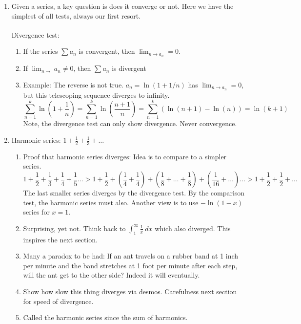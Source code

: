 \documentclass{article}
\begin{document}
\begin{enumerate}
\item Given a series, a key question is does it converge or not. Here we have the simplest of all tests, always our first resort. \\ \ \\
Divergence test:
\begin{enumerate}
\item If the series $\sum a_n$ is convergent, then $\lim_{n\rightarrow a_n} =0$. 
\item If $\lim_{n\rightarrow }a_n\neq 0$, then $\sum a_n$ is divergent
\item Example: The reverse is not true. $a_n =\ln (1+1/n)$ has $\lim_{n\rightarrow a_n} =0$, but this telescoping sequence diverges to infinity.
$$
\sum_{n=1}^k \ln\left(1+\frac{1}{n}\right) =
\sum_{n=1}^k \ln\left(\frac{n+1}{n}\right) =
\sum_{n=1}^k \left(\ln(n+1)-\ln(n) \right) = 
\ln(k+1)
$$
Note, the divergence test can only show divergence. Never convergence.

\end{enumerate}
\item Harmonic series: $1+\frac{1}{2} + \frac{1}{3} + \dots$
\begin{enumerate}

\item Proof that harmonic series diverges: Idea is to compare to a simpler series.
\[
1+\frac{1}{2} + \frac{1}{3} + \frac{1}{4} + \frac{1}{5} \dots >
1+\frac{1}{2} + \left( \frac{1}{4} + \frac{1}{4} \right) + \left(\frac{1}{8}+ \dots +\frac{1}{8}\right) + \left( \frac{1}{16} + \dots \right) \dots >
1 + \frac{1}{2}+\frac{1}{2}+\dots
\]
The last smaller series diverges by the divergence test. By the comparison test, the harmonic series must also. Another view is to use $-\ln(1-x)$ series for $x=1$.

\item Surprising, yet not. Think back to $\int_1^\infty \frac{1}{x}~dx$ which also diverged. This inspires the next section.
\item Many a paradox to be had: If an ant travels on a rubber band at 1 inch per minute and the band stretches at 1 foot per minute after each step, will the ant get to the other side? Indeed it will eventually.
\item Show how slow this thing diverges via desmos. Carefulness next section for speed of divergence.
\item Called the harmonic series since the sum of harmonics.
\end{enumerate}


\end{enumerate}
\end{document}

